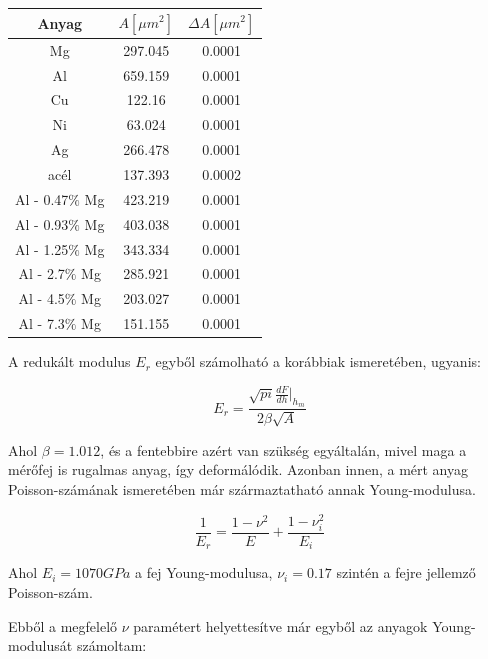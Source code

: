 \documentclass[a4paper,12pt]{article}
\begin{document}
\begin{center}
\begin{tabular}{|c|c|c|}
\hline
Anyag & $A [\mu m^{2}]$ & $\Delta A [\mu m^{2}]$ \\
\hline
Mg &297.045 &0.0001\\
\hline
Al &659.159 &0.0001\\
\hline
Cu &122.16 &0.0001\\
\hline
Ni& 63.024 &0.0001\\
\hline
Ag &266.478 &0.0001\\
\hline
acél& 137.393 &0.0002\\
\hline
Al - 0.47$\%$ Mg &423.219 &0.0001\\
\hline
Al - 0.93$\%$ Mg &403.038 &0.0001\\
\hline
Al - 1.25$\%$ Mg &343.334 &0.0001\\
\hline
Al - 2.7$\%$ Mg &285.921 &0.0001\\
\hline
Al - 4.5$\%$ Mg &203.027 &0.0001\\
\hline
Al - 7.3$\%$ Mg &151.155 &0.0001\\
\hline
\end{tabular}
\end{center}

\par A redukált modulus $E_{r}$ egyből számolható a korábbiak ismeretében, ugyanis:

\begin{equation*}
E_{r} = \frac{\sqrt{pi}\frac{dF}{dh}|_{h_{m}}}{2\beta\sqrt{A}}
\end{equation*}

\par Ahol $\beta = 1.012$, és a fentebbire azért van szükség egyáltalán, mivel maga a mérőfej is rugalmas anyag, így deformálódik. Azonban innen, a mért anyag Poisson-számának ismeretében már származtatható annak Young-modulusa.

\begin{equation*}
\frac{1}{E_{r}} = \frac{1 - \nu^{2}}{E} + \frac{1-\nu^{2}_{i}}{E_{i}}
\end{equation*}

\par Ahol $E_{i} = 1070 GPa$ a fej Young-modulusa, $\nu_{i} = 0.17$ szintén a fejre jellemző Poisson-szám.

\par Ebből a megfelelő $\nu$ paramétert helyettesítve már egyből az anyagok Young-modulusát számoltam:
\end{document}
